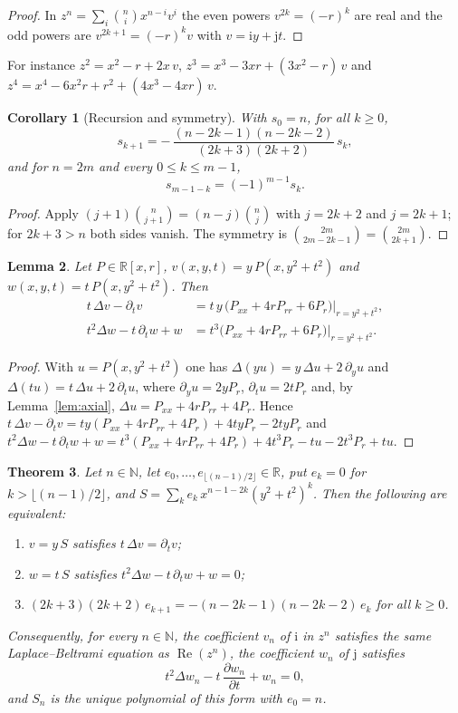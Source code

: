 \documentclass[11pt,a4paper]{article}
\newcommand{\ii}{\mathrm{i}}
\newcommand{\jj}{\mathrm{j}}
\DeclareMathOperator{\Real}{Re}
\newcommand{\R}{\mathbb{R}}
\newcommand{\N}{\mathbb{N}}
\newtheorem{theorem}{Theorem}
\newtheorem{corollary}[theorem]{Corollary}
\newtheorem{lemma}[theorem]{Lemma}
\theoremstyle{remark}
\begin{document}
\begin{proof}
In $z^n=\sum_i\binom{n}{i}x^{n-i}v^i$ the even powers $v^{2k}=(-r)^k$ are real and the odd
powers are $v^{2k+1}=(-r)^k v$ with $v=\ii y+\jj t$.
\end{proof}

For instance $z^2=x^2-r+2x\,v$, $z^3=x^3-3xr+(3x^2-r)\,v$ and
$z^4=x^4-6x^2r+r^2+(4x^3-4xr)\,v$.

\begin{corollary}[Recursion and symmetry]\label{cor:srec}
With $s_0=n$, for all $k\ge 0$,
\[
  \boxed{\;s_{k+1}=-\,\frac{(n-2k-1)(n-2k-2)}{(2k+3)(2k+2)}\,s_k ,\;}
\]
and for $n=2m$ and every $0\le k\le m-1$,
\[
  s_{m-1-k}=(-1)^{m-1}s_k .
\]
\end{corollary}

\begin{proof}
Apply $(j+1)\binom{n}{j+1}=(n-j)\binom{n}{j}$ with $j=2k+2$ and $j=2k+1$; for $2k+3>n$
both sides vanish. The symmetry is $\binom{2m}{2m-2k-1}=\binom{2m}{2k+1}$.
\end{proof}

\begin{lemma}\label{lem:axialim}
Let $P\in\R[x,r]$, $v(x,y,t)=y\,P(x,y^2+t^2)$ and $w(x,y,t)=t\,P(x,y^2+t^2)$. Then
\begin{align*}
  t\,\Delta v-\partial_t v&=t\,y\,\bigl(P_{xx}+4rP_{rr}+6P_r\bigr)\big|_{r=y^2+t^2},\\
  t^2\Delta w-t\,\partial_t w+w&=t^3\bigl(P_{xx}+4rP_{rr}+6P_r\bigr)\big|_{r=y^2+t^2}.
\end{align*}
\end{lemma}

\begin{proof}
With $u=P(x,y^2+t^2)$ one has $\Delta(yu)=y\,\Delta u+2\,\partial_yu$ and
$\Delta(tu)=t\,\Delta u+2\,\partial_tu$, where $\partial_yu=2yP_r$, $\partial_tu=2tP_r$ and,
by Lemma~\ref{lem:axial}, $\Delta u=P_{xx}+4rP_{rr}+4P_r$. Hence
$t\,\Delta v-\partial_tv=ty(P_{xx}+4rP_{rr}+4P_r)+4tyP_r-2tyP_r$ and
$t^2\Delta w-t\,\partial_tw+w=t^3(P_{xx}+4rP_{rr}+4P_r)+4t^3P_r-tu-2t^3P_r+tu$.
\end{proof}

\begin{theorem}\label{thm:imaglb}
Let $n\in\N$, let $e_0,\dots,e_{\lfloor (n-1)/2\rfloor}\in\R$, put $e_k=0$ for
$k>\lfloor (n-1)/2\rfloor$, and $S=\sum_k e_k\,x^{n-1-2k}(y^2+t^2)^k$. Then the following are
equivalent:
\begin{enumerate}
  \item $v=y\,S$ satisfies $t\,\Delta v=\partial_t v$;
  \item $w=t\,S$ satisfies $t^2\Delta w-t\,\partial_t w+w=0$;
  \item $(2k+3)(2k+2)\,e_{k+1}=-(n-2k-1)(n-2k-2)\,e_k$ for all $k\ge0$.
\end{enumerate}
Consequently, for every $n\in\N$, the coefficient $v_n$ of $\ii$ in $z^n$ satisfies the same
Laplace--Beltrami equation as $\Real(z^n)$, the coefficient $w_n$ of $\jj$ satisfies
\[
  \boxed{\;t^2\Delta w_n-t\,\frac{\partial w_n}{\partial t}+w_n=0,\;}
\]
and $S_n$ is the unique polynomial of this form with $e_0=n$.
\end{theorem}
\end{document}
